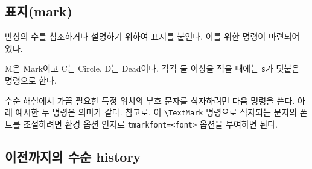 \documentclass[figtabcapt,a4paper]{oblivoir}
\begin{document}
\subsection{표지(mark)}

반상의 수를 참조하거나 설명하기 위하여 표지를 붙인다. 이를 위한 명령이 마련되어 있다.

\begin{boxedverbatim}
   
  
  
\end{boxedverbatim}

\begin{ksbadukpan}[badukpansize=7,badukpancolor=yellow!20][DL]
   
  
  
\end{ksbadukpan}

M은 Mark이고 C는 Circle, D는 Dead이다. 각각 둘 이상을 적을 때에는 \texttt{s}가 덧붙은 명령으로 한다.

수순 해설에서 가끔 필요한 특정 위치의 부호 문자를 식자하려면 다음 명령을 쓴다. 아래 예시한 두 명령은
의미가 같다. 참고로, 이 \verb|\TextMark| 명령으로 식자되는 문자의 폰트를 조절하려면 환경 옵션 인자로
\texttt{tmarkfont=<font>} 옵션을 부여하면 된다.
\begin{boxedverbatim}
  
\end{boxedverbatim}

\begin{boxedverbatim}
\begin{ksbadukpan}[tmarkfont={\sffamily\bfseries\normalsize}][DL]
\end{ksbadukpan}
\end{boxedverbatim}

\begin{ksbadukpan}[badukpansize=7,badukpancolor=yellow!20][DL]
  
\end{ksbadukpan}
\quad
\begin{ksbadukpan}[badukpansize=7,badukpancolor=yellow!20,tmarkfont={\sffamily\bfseries\normalsize}][DL]
\end{ksbadukpan}


\subsection{이전까지의 수순 history}

\begin{boxedverbatim}
\KSBadukContinue
\end{boxedverbatim}
\end{document}
